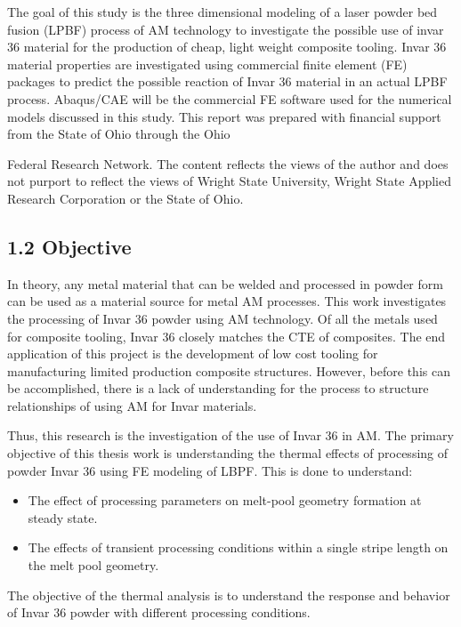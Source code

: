 \documentclass[10pt]{article}
\begin{document}
The goal of this study is the three dimensional modeling of a laser powder bed fusion (LPBF) process of AM technology to investigate the possible use of invar 36 material for the production of cheap, light weight composite tooling. Invar 36 material properties are investigated using commercial finite element (FE) packages to predict the possible reaction of Invar 36 material in an actual LPBF process. Abaqus/CAE will be the commercial FE software used for the numerical models discussed in this study. This report was prepared with financial support from the State of Ohio through the Ohio

Federal Research Network. The content reflects the views of the author and does not purport to reflect the views of Wright State University, Wright State Applied Research Corporation or the State of Ohio.

\subsection*{1.2 Objective}
In theory, any metal material that can be welded and processed in powder form can be used as a material source for metal AM processes. This work investigates the processing of Invar 36 powder using AM technology. Of all the metals used for composite tooling, Invar 36 closely matches the CTE of composites. The end application of this project is the development of low cost tooling for manufacturing limited production composite structures. However, before this can be accomplished, there is a lack of understanding for the process to structure relationships of using AM for Invar materials.

Thus, this research is the investigation of the use of Invar 36 in AM. The primary objective of this thesis work is understanding the thermal effects of processing of powder Invar 36 using FE modeling of LBPF. This is done to understand:

\begin{itemize}
  \item The effect of processing parameters on melt-pool geometry formation at steady state.

  \item The effects of transient processing conditions within a single stripe length on the melt pool geometry.

\end{itemize}

The objective of the thermal analysis is to understand the response and behavior of Invar 36 powder with different processing conditions.
\end{document}
